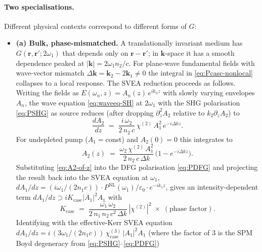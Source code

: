 \documentclass[11pt,a4paper]{article}
\newcommand{\eps}{\varepsilon}
\newcommand{\bvec}[1]{\mathbf{#1}}
\newcommand{\ri}{\bvec{r}}
\newcommand{\chitwo}{\chi^{(2)}}
\newcommand{\chithree}{\chi^{(3)}}
\begin{document}
\paragraph{Two specialisations.}
Different physical contexts correspond to different forms of $G$:
\begin{itemize}\setlength{\itemsep}{3pt}
  \item \textbf{(a) Bulk, phase-mismatched.}  A translationally
    invariant medium has $G(\ri,\ri';2\omega_1)$ that depends only on
    $\ri-\ri'$; in $\mathbf k$-space it has a smooth dependence peaked
    at $|\mathbf k|=2\omega_1 n_2/c$.  For plane-wave fundamental
    fields with wave-vector mismatch
    $\Delta\mathbf k=\mathbf k_2-2\mathbf k_1\neq 0$ the integral in
    \eqref{eq:Pcasc-nonlocal} collapses to a local response.  The
    SVEA reduction \cite{DeSalvo1992,Stegeman1996,Boyd} proceeds as
    follows.  Writing the fields as
    $E(\omega_n,z)=A_n(z)\,e^{i k_n z}$ with slowly varying envelopes
    $A_n$, the wave equation \eqref{eq:waveeq-SH} at $2\omega_1$ with
    the SHG polarisation \eqref{eq:PSHG} as source reduces (after
    dropping $\partial_z^{2}A_2$ relative to $k_2\partial_z A_2$) to
    \cite[\S 2.4]{Boyd}
    \begin{equation}
      \frac{dA_2}{dz}\;=\;\frac{i\,\omega_2}{2\,n_2\,c}\,\chitwo\,A_1^{2}\,
                      e^{-i\Delta k z}.
      \label{eq:SVEA-A2}
    \end{equation}
    For undepleted pump ($A_1=$const) and $A_2(0)=0$ this integrates to
    \begin{equation}
      A_2(z)\;=\;\frac{\omega_2\,\chitwo\,A_1^{2}}{2\,n_2\,c\,\Delta k}\,
                \bigl(1-e^{-i\Delta k z}\bigr).
      \label{eq:A2-of-z}
    \end{equation}
    Substituting \eqref{eq:A2-of-z} into the DFG polarisation
    \eqref{eq:PDFG} and projecting the result back into the SVEA
    equation at $\omega_1$,
    $dA_1/dz=(i\omega_1/(2 n_1 c)) \cdot P^\text{NL}(\omega_1)/\eps_0
    \cdot e^{-i k_1 z}$, gives an intensity-dependent term
    $dA_1/dz\supset iK_\text{casc}|A_1|^{2}A_1$ with
    \begin{equation*}
      K_\text{casc}\;=\;\frac{\omega_1\,\omega_2}{2\,n_1\,n_2\,c^{2}\,\Delta k}
                       \,|\chitwo|^{2}\;\times\;(\text{phase factor}).
    \end{equation*}
    Identifying with the effective-Kerr SVEA equation
    $dA_1/dz=i\,(3\omega_1/(2 n_1 c))\,\chithree_\text{casc}\,|A_1|^{2}A_1$
    (where the factor of $3$ is the SPM Boyd degeneracy from \eqref{eq:PSHG}--\eqref{eq:PDFG})

\end{itemize}
\end{document}
